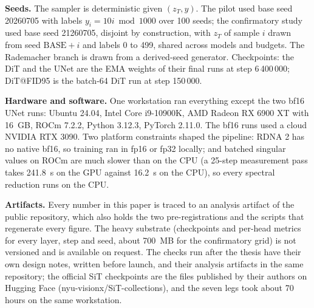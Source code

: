 \documentclass{article}
\begin{document}
\textbf{Seeds.} The sampler is deterministic given $(z_T, y)$. The pilot used base seed 20260705 with labels $y_i = 10 i \bmod 1000$ over 100 seeds; the confirmatory study used base seed 21260705, disjoint by construction, with $z_T$ of sample $i$ drawn from seed $\mathrm{BASE} + i$ and labels 0 to 499, shared across models and budgets. The Rademacher branch is drawn from a derived-seed generator. Checkpoints: the DiT and the UNet are the EMA weights of their final runs at step 6\,400\,000; DiT@FID95 is the batch-64 DiT run at step 150\,000.

\textbf{Hardware and software.} One workstation ran everything except the two bf16 UNet runs: Ubuntu 24.04, Intel Core i9-10900K, AMD Radeon RX 6900 XT with 16~GB, ROCm 7.2.2, Python 3.12.3, PyTorch 2.11.0. The bf16 runs used a cloud NVIDIA RTX 3090. Two platform constraints shaped the pipeline: RDNA 2 has no native bf16, so training ran in fp16 or fp32 locally; and batched singular values on ROCm are much slower than on the CPU (a 25-step measurement pass takes 241.8~s on the GPU against 16.2~s on the CPU), so every spectral reduction runs on the CPU.

\textbf{Artifacts.} Every number in this paper is traced to an analysis artifact of the public repository, which also holds the two pre-registrations and the scripts that regenerate every figure. The heavy substrate (checkpoints and per-head metrics for every layer, step and seed, about 700~MB for the confirmatory grid) is not versioned and is available on request. The checks run after the thesis have their own design notes, written before launch, and their analysis artifacts in the same repository; the official SiT checkpoints are the files published by their authors on Hugging Face (nyu-visionx/SiT-collections), and the seven legs took about 70 hours on the same workstation.
\end{document}
